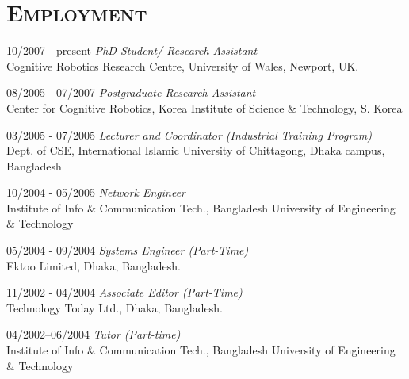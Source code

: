 \documentclass[notopicbreak,contbibnum,plain]{simplecv}
\begin{document}
\section{\textsc{Employment}}
\begin{topic}
	\item[10/2007 - present] \textit{PhD Student/ Research Assistant}\\
    Cognitive Robotics Research Centre,
    University of Wales, Newport, UK.
\vspace*{-0.1cm}    
    \item[08/2005 - 07/2007] \textit{Postgraduate Research Assistant\\}
    Center for Cognitive Robotics,
    Korea Institute of Science \& Technology, S. Korea
\vspace*{-0.1cm}
\item[03/2005 - 07/2005] \textit{Lecturer and Coordinator (Industrial Training Program)}\\
	Dept. of CSE, International Islamic University of Chittagong, Dhaka campus, Bangladesh
\vspace*{-0.1cm}    
    \item[10/2004 - 05/2005] \textit{Network Engineer}\\
	Institute of Info \& Communication Tech.,
	Bangladesh University of Engineering \& Technology
\vspace*{-0.1cm}
	\item[05/2004 - 09/2004]\textit{ Systems Engineer (Part-Time)}\\
	Ektoo Limited, Dhaka, Bangladesh.
\vspace*{-0.1cm}
	\item[11/2002 - 04/2004] \textit{Associate Editor (Part-Time)}\\
	Technology Today Ltd., Dhaka, Bangladesh.
\vspace*{-0.1cm}
	\item[04/2002--06/2004] \textit{Tutor (Part-time)}\\
	 Institute of Info \& Communication Tech.,
	Bangladesh University of Engineering \& Technology        
\end{topic}
\vspace*{-0.1cm}
\end{document}
